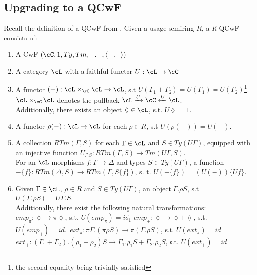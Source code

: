 \documentclass[12pt,a4paper]{article}
\begin{document}
\subsection*{Upgrading to a QCwF}
Recall the definition of a QCwF from \cite{fill}.
Given a usage semiring $R$, a $R$-QCwF consists of:
\begin{enumerate}[noitemsep]
  \item A CwF $(\cC, 1, Ty, Tm, -.-, \langle-.-\rangle)$
  
  \item A category $\cL$ with a faithful functor $U : \cL \to \cC$
  
  \item A functor $(+) : \cL \times_\cC \cL \to \cL$, s.t $U(\Gamma_1 + \Gamma_2) = U(\Gamma_1) = U(\Gamma_2)$\footnote{the second equality being trivially satisfied}. $\cL \times_\cC \cL$ denotes the pullback $\cL \xrightarrow{U} \cC \xleftarrow{U} \cL$.\\
  Additionally, there exists an object $\lozenge \in \cL$, s.t. $U\lozenge = 1$.
  
  \item A functor $\rho(-): \cL \to \cL$ for each $\rho \in R$, s.t $U(\rho(-)) = U(-)$.
  
  \item A collection $RTm(\Gamma, S)$ for each $\Gamma \in \cL$ and $S \in Ty(U\Gamma)$, equipped with an injective function $U_{\Gamma.S} : RTm(\Gamma, S) \to Tm(U\Gamma, S)$.\\
  For an $\cL$ morphisms $f: \Gamma \to \Delta$ and types $S \in Ty(U\Gamma)$, a function $-\{f\} : RTm(\Delta, S) \to RTm(\Gamma, S\{f\})$, s. t. $U(-\{f\}) = (U(-))\{Uf\}$.
         
  \item Given $\Gamma \in \cL$, $\rho \in R$ and $S \in Ty(U\Gamma)$, an object $\Gamma. \rho S$, s.t $U(\Gamma. \rho S) = U\Gamma.S$.\\
  Additionally, there exist the following natural transformations:
  \subitem $emp_\pi : \lozenge \to \pi\lozenge$, s.t. $U(emp_\pi)=id_1$
  \subitem $emp_+ : \lozenge \to \lozenge + \lozenge$, s.t. $U(emp_+)=id_1$
  \subitem $ext_\pi : \pi\Gamma. (\pi\rho S) \to \pi(\Gamma. \rho S)$, s.t. $U(ext_\pi) = id$ 
  \subitem $ext_+ : (\Gamma_1 + \Gamma_2).(\rho_1 + \rho_2)S \to \Gamma_1.\rho_1 S + \Gamma_2 . \rho_2 S$, s.t.  $U(ext_+) = id$ 
  

\end{enumerate}
\end{document}
